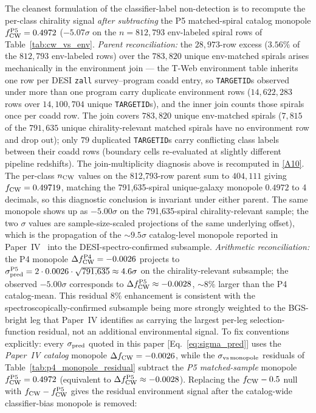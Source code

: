 \documentclass[aps,prd,twocolumn,superscriptaddress,showpacs,preprintnumbers,nofootinbib,longbibliography,floatfix]{revtex4-2}
\newcommand{\repoBase}{https://github.com/Hubify-Projects/bigbounce/blob/main}
\begin{document}
The cleanest
formulation of the classifier-label non-detection is to recompute
the per-class chirality signal \emph{after subtracting} the P5
matched-spiral catalog monopole $f_{\rm CW}^{\rm P5} = 0.4972$
($-5.07\sigma$ on the $n = 812{,}793$ env-labeled spiral rows of
Table~\ref{tab:cw_vs_env}. \emph{Parent reconciliation:} the
$28{,}973$-row excess ($3.56\%$ of the $812{,}793$ env-labeled rows) over the $783{,}820$ unique
env-matched spirals arises mechanically in the
environment join — the T-Web environment table inherits one row per
DESI \texttt{zall} survey--program coadd entry, so \texttt{TARGETID}s
observed under more than one program carry duplicate environment rows
($14{,}622{,}283$ rows over $14{,}100{,}704$ unique
\texttt{TARGETID}s), and the inner join counts those spirals once per
coadd row. The join covers $783{,}820$ unique env-matched spirals
($7{,}815$ of the $791{,}635$ unique chirality-relevant matched spirals have no environment row and drop out); only $79$
duplicated \texttt{TARGETID}s carry conflicting class labels between
their coadd rows (boundary cells re-evaluated at slightly different
pipeline redshifts). The join-multiplicity diagnosis above is recomputed in
\href{\repoBase/pipelines/p5\_desi\_chirality/outputs/17\_v0151\_closure\_recomputes.json}{[A10]}. The per-class
$n_{\rm CW}$ values on the 812{,}793-row parent sum to
$404{,}111$ giving $f_{\rm CW} = 0.49719$, matching the 791{,}635-spiral
unique-galaxy monopole $0.4972$ to 4 decimals, so this diagnostic
conclusion is
invariant under either parent. The same monopole shows up as
$-5.00\sigma$ on the
791{,}635-spiral chirality-relevant sample; the two $\sigma$ values
are sample-size-scaled projections of the same underlying offset),
which is the propagation of the
$\sim\!9.5\sigma$ catalog-level monopole reported in
Paper~IV~\cite{golden_chirality_2026} into the DESI-spectro-confirmed
subsample. \emph{Arithmetic reconciliation:} the P4 monopole
$\Delta f_{\rm CW}^{\rm P4} = -0.0026$ projects to
$\sigma_{\rm pred}^{\rm P5} = 2 \cdot 0.0026 \cdot \sqrt{791{,}635}
\approx 4.6\sigma$ on the chirality-relevant subsample; the observed
$-5.00\sigma$ corresponds to $\Delta f_{\rm CW}^{\rm P5} \approx
-0.0028$, ${\sim}8\%$ larger than the P4 catalog-mean. This residual
$8\%$ enhancement is consistent with the spectroscopically-confirmed
subsample being more strongly weighted to the BGS-bright leg that
Paper~IV identifies as carrying the largest per-leg
selection-function residual, not an additional environmental signal.
To fix conventions explicitly: every $\sigma_{\rm pred}$ quoted in
this paper [Eq.~\eqref{eq:sigma_pred}] uses the \emph{Paper~IV
catalog} monopole $\Delta f_{\rm CW} = -0.0026$, while the
$\sigma_{\rm vs\,monopole}$ residuals of
Table~\ref{tab:p4_monopole_residual} subtract the \emph{P5
matched-sample} monopole $f_{\rm CW}^{\rm P5} = 0.4972$ (equivalent
to $\Delta f_{\rm CW}^{\rm P5} \approx -0.0028$). Replacing the $f_{\rm CW} - 0.5$ null with
$f_{\rm CW} - f_{\rm CW}^{\rm P5}$ gives the residual environment
signal after the catalog-wide classifier-bias monopole is removed:
\end{document}
